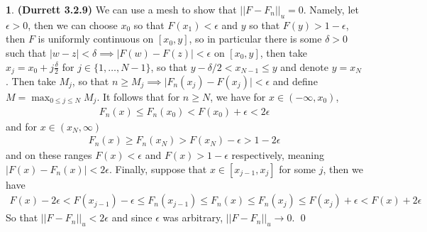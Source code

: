 \documentclass[10.5pt]{article}
\theoremstyle{definition}
\newtheorem{pb}{}
\newcommand{\set}[1]{\{#1\}}
\newcommand{\abs}[1]{\lvert#1\rvert}
\newcommand{\norm}[1]{\lvert\lvert#1\rvert\rvert}
\begin{document}
    \begin{pb}\textbf{(Durrett 3.2.9)}
        We can use a mesh to show that \(\norm{F - F_n}_u = 0\). Namely, let \(\epsilon > 0\), then we can choose \(x_0\) so that \(F(x_1) < \epsilon\) and \(y\) so that \(F(y) > 1 - \epsilon\), then \(F\) is uniformly continuous on \([x_0,y]\), so in particular there is some \(\delta > 0\) such that \(\abs{w - z} < \delta \implies \abs{F(w) - F(z)} < \epsilon\) on \([x_0,y]\), then take \(x_j = x_0 + j\frac{\delta}{2}\) for \(j \in \set{1,\hdots,N-1}\), so that \(y - \delta/2 < x_{N-1} \leq y\) and denote \(y = x_N\). Then take \(M_j\), so that \(n \geq M_j \implies \abs{F_n(x_j) - F(x_j)} < \epsilon\) and define \(M = \max_{0 \leq j \leq N}M_j\). It follows that for \(n \geq N\), we have for \(x \in (-\infty,x_0)\),
        \begin{align*}
            F_n(x) \leq F_n(x_0) < F(x_0) + \epsilon < 2 \epsilon
        \end{align*}
        and for \(x \in (x_N,\infty)\)
        \begin{align*}
            F_n(x) \geq F_n(x_N) > F(x_N) - \epsilon > 1- 2 \epsilon
        \end{align*}
        and on these ranges \(F(x) < \epsilon\) and \(F(x) > 1 - \epsilon\) respectively, meaning \(\abs{F(x) - F_n(x)} < 2 \epsilon\). Finally, suppose that \(x \in [x_{j-1},x_j]\) for some \(j\), then we have
        \begin{align*}
            F(x) - 2 \epsilon < F(x_{j-1}) - \epsilon \leq F_n(x_{j-1}) \leq F_n(x) \leq F_n(x_j) \leq F(x_j) + \epsilon < F(x) + 2 \epsilon
        \end{align*}
        So that \(\norm{F - F_n}_u < 2 \epsilon\) and since \(\epsilon\) was arbitrary, \(\norm{F -F_n}_u \to 0\). \qed
    \end{pb}
\end{document}
